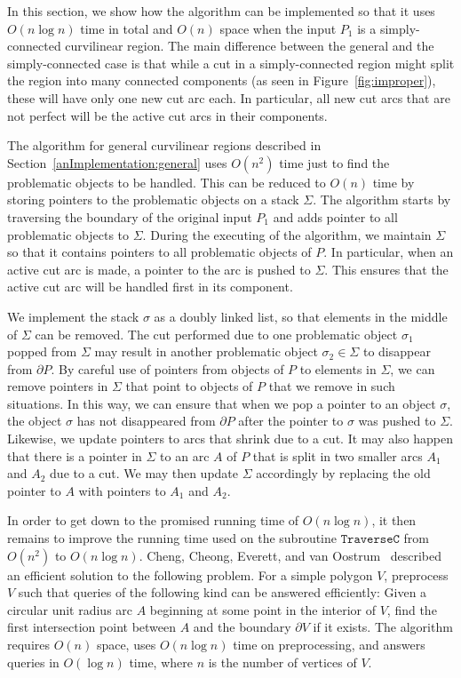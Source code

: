 \documentclass{article}
\newcommand{\ttt}[1]{\texttt{#1}}
\newcommand{\PP}{P}
\newcommand{\stack}{\Sigma}
\newcommand{\se}{\sigma}
\newcommand{\arcA}{A}
\begin{document}
In this section, we show how the algorithm can be implemented so
that it uses $O(n\log n)$
time in total and $O(n)$ space when the input $\PP_1$ is a simply-connected curvilinear region.
The main difference between the general and the simply-connected case is that while a cut in a simply-connected region might split the region into many connected components (as seen in Figure~\ref{fig:improper}), these will have only one new cut arc each.
In particular, all new cut arcs that are not perfect will be the active cut arcs in their components.

The algorithm for general curvilinear regions described in Section~\ref{anImplementation:general} uses $O(n^2)$ time just to find the problematic objects to be handled.
This can be reduced to $O(n)$ time by storing pointers to the problematic objects on a stack $\stack$.
The algorithm starts by traversing the boundary of the original input $\PP_1$ and adds pointer to all problematic objects to $\stack$.
During the executing of the algorithm, we maintain $\stack$ so that it contains pointers to all problematic objects of $\PP$.
In particular, when an active cut arc is made, a pointer to the arc is pushed to $\stack$.
This ensures that the active cut arc will be handled first in its component.

We implement the stack $\sigma$ as a doubly linked list, so that elements in the middle of $\stack$ can be removed.
The cut performed due to one problematic object $\se_1$ popped from $\stack$ may result in another problematic object $\se_2\in\stack$ to disappear from $\partial\PP$.
By careful use of pointers from objects of $\PP$ to elements in $\stack$, we can remove pointers in $\stack$ that point to objects of $\PP$ that we remove in such situations.
In this way, we can ensure that when we pop a pointer to an object $\sigma$, the object $\sigma$ has not disappeared from $\partial\PP$ after the pointer to $\sigma$ was pushed to $\stack$.
Likewise, we update pointers to arcs that shrink due to a cut.
It may also happen that there is a pointer in $\stack$ to an arc $\arcA$ of $\PP$ that is split in two smaller arcs $\arcA_1$ and $\arcA_2$ due to a cut.
We may then update $\stack$ accordingly by replacing the old pointer to $\arcA$ with pointers to $\arcA_1$ and $\arcA_2$.

In order to get down to the promised running time of $O(n\log n)$, it then remains to improve the running time used on the subroutine $\ttt{TraverseC}$ from $O(n^2)$ to $O(n\log n)$.
Cheng, Cheong, Everett, and van Oostrum~\cite{Cheng04} described an efficient solution to the following problem.
For a simple polygon $V$, preprocess $V$ such that queries of the following
kind can be answered efficiently: Given a circular unit radius arc $\arcA$ beginning
at some point in the interior of $V$, find the first intersection point between $\arcA$ and
the boundary $\partial V$ if it exists.
The algorithm requires $O(n)$ space, uses $O(n\log n)$ time on preprocessing, and answers queries in $O(\log n)$ time, where $n$ is the number of vertices of $V$.
\end{document}
